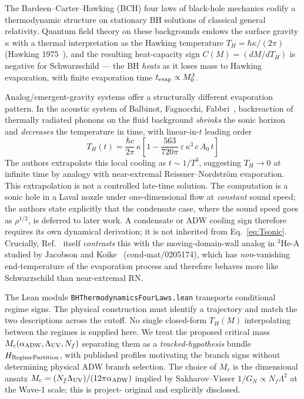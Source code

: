 \documentclass[prd,aps,twocolumn,floatfix,nofootinbib,superscriptaddress]{revtex4-2}
\newcommand{\Mc}{M_{c}}
\newcommand{\Thawk}{T_{H}}
\newcommand{\aADW}{\alpha_{\rm ADW}}
\newcommand{\Ladw}{\Lambda_{\rm UV}}
\newcommand{\Nf}{N_{f}}
\begin{document}
The Bardeen--Carter--Hawking (BCH) four laws of black-hole mechanics
codify a thermodynamic structure on stationary BH solutions of
classical general relativity. Quantum field theory on these
backgrounds endows the surface gravity $\kappa$ with a thermal
interpretation as the Hawking temperature $\Thawk = \hbar\kappa/(2\pi)$
(Hawking 1975~\cite{Hawking1975CMP}), and the resulting
heat-capacity sign $C(M) = (dM/d\Thawk)$ is negative for
Schwarzschild --- the BH \emph{heats} as it loses mass to
Hawking evaporation, with finite evaporation time $t_{\rm evap}
\propto M_0^3$.

Analog/emergent-gravity systems offer a structurally different
evaporation pattern. In the acoustic system of Balbinot,
Fagnocchi, Fabbri~\cite{Balbinot2005PRD},
backreaction of thermally radiated phonons on the fluid background
\emph{shrinks} the sonic horizon and \emph{decreases} the temperature
in time, with linear-in-$t$ leading order
\begin{equation}
\Thawk(t) = \frac{\hbar c}{2\pi}\,\kappa \left[
  1 - \frac{563}{720\pi}\,\varepsilon\,\kappa^{3}\,c\,A_{0}\,t
\right]
\label{eq:Tsonic}
\end{equation}
The authors extrapolate this local cooling as $t \sim 1/T^3$,
suggesting $\Thawk \to 0$ at infinite time by analogy with
near-extremal Reissner--Nordstr\"om evaporation. This extrapolation is
not a controlled late-time solution. The computation is a sonic hole in a Laval
nozzle under one-dimensional flow at \emph{constant} sound speed;
the authors state explicitly that the condensate case, where the sound
speed goes as $\rho^{1/2}$, is deferred to later work. A condensate or
ADW cooling sign therefore requires its own dynamical derivation;
it is not inherited from Eq.~\eqref{eq:Tsonic}. Crucially, Ref.~\cite{Balbinot2005PRD}
itself \emph{contrasts} this with the moving-domain-wall analog
in $^3$He-A studied by Jacobson and Koike~\cite{JacobsonKoike2002}
(cond-mat/0205174), which has \emph{non}-vanishing end-temperature
of the evaporation process and therefore behaves more like
Schwarzschild than near-extremal RN.

The Lean module \texttt{BHThermodynamicsFourLaws.lean} transports
conditional regime signs. The physical construction must identify a trajectory and
match the two descriptions across the cutoff. No single closed-form
$\Thawk(M)$ interpolating between the regimes is supplied here.
We treat the proposed critical mass
$\Mc(\aADW, \Ladw, \Nf)$ separating them as a
\emph{tracked-hypothesis} bundle $H_{\rm RegimePartition}$, with
published profiles motivating the branch signs without determining
physical ADW branch selection. The choice of $\Mc$ is the dimensional ansatz
$\Mc = (\Nf \Ladw) / (12\pi \aADW)$ implied by Sakharov--Visser
$1/G_N \propto \Nf \Lambda^2$ at the Wave-1 scale; this is project-
original and explicitly disclosed.
\end{document}
